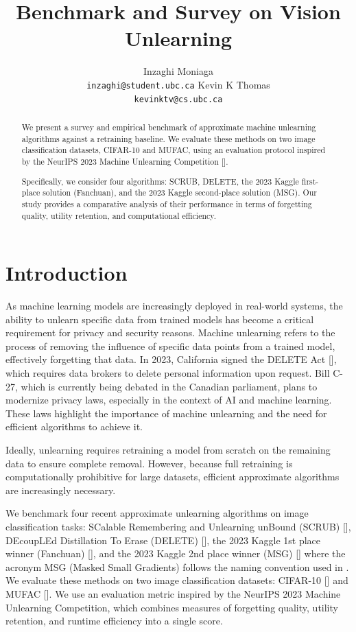 \documentclass{article}
\title{Benchmark and Survey on Vision Unlearning}
\author{%
  Inzaghi Moniaga\\
  \texttt{inzaghi@student.ubc.ca}
  \And
  Kevin K Thomas\\
  \texttt{kevinktv@cs.ubc.ca}
}
\begin{document}
\maketitle
\begin{abstract}
We present a survey and empirical benchmark of approximate machine unlearning algorithms against a retraining baseline. We evaluate these methods on two image classification datasets, CIFAR-10 and MUFAC, using an evaluation protocol inspired by the NeurIPS 2023 Machine Unlearning Competition [\cite{neurips-2023-machine-unlearning}].

Specifically, we consider four algorithms: SCRUB, DELETE, the 2023 Kaggle first-place solution (Fanchuan), and the 2023 Kaggle second-place solution (MSG). Our study provides a comparative analysis of their performance in terms of forgetting quality, utility retention, and computational efficiency.
\end{abstract}

\section{Introduction}
As machine learning models are increasingly deployed in real-world systems, the ability to unlearn specific data from trained models has become a critical requirement for privacy and security reasons. Machine unlearning refers to the process of removing the influence of specific data points from a trained model, effectively forgetting that data. 
In 2023, California signed the DELETE Act [\cite{delete_act}], which requires data brokers to delete personal information upon request. Bill C-27, which is currently being debated in the Canadian parliament, plans to modernize privacy laws, especially in the context of AI and machine learning. These laws highlight the importance of machine unlearning and the need for efficient algorithms to achieve it.

Ideally, unlearning requires retraining a model from scratch on the remaining data to ensure complete removal. However, because full retraining is computationally prohibitive for large datasets, efficient approximate algorithms are increasingly necessary.

We benchmark four recent approximate unlearning algorithms on image classification tasks:
SCalable Remembering and Unlearning unBound (SCRUB) [\cite{kurmanji2023unboundedmachineunlearning}], DEcoupLEd Distillation To Erase (DELETE) [\cite{zhou2025decoupleddistillationerasegeneral}], the 2023 Kaggle 1st place winner (Fanchuan) [\cite{2023-winner}], and the 2023 Kaggle 2nd place winner (MSG) [\cite{2023-second-place}] where the acronym MSG (Masked Small Gradients) follows the naming convention used in \citet{cadet2025}. 
We evaluate these methods on two image classification datasets: CIFAR-10 [\cite{Krizhevsky09learningmultiple}] and MUFAC [\cite{choi2023machine}]. We use an evaluation metric inspired by the NeurIPS 2023 Machine Unlearning Competition, which combines measures of forgetting quality, utility retention, and runtime efficiency into a single score.
\end{document}
